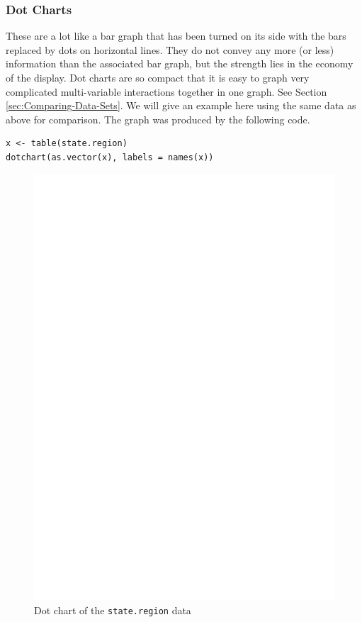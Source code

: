 \documentclass[captions=tableheading]{scrbook}
\begin{document}
\subsubsection{Dot Charts}
\label{sec-2-1-4-4}
\label{par:Dotcharts}


These are a lot like a bar graph that has been turned on its side with the bars replaced by dots on horizontal lines. They do not convey any more (or less) information than the associated bar graph, but the strength lies in the economy of the display. Dot charts are so compact that it is easy to graph very complicated multi-variable interactions together in one graph. See Section \ref{sec:Comparing-Data-Sets}. We will give an example here using the same data as above for comparison. The graph was produced by the following code.

\begin{example}


\begin{verbatim}
x <- table(state.region)
dotchart(as.vector(x), labels = names(x))
\end{verbatim}





\begin{figure}[th]
  \includegraphics[angle=270, totalheight=4in]{ps/dot-charts.ps}
  \caption{Dot chart of the \texttt{state.region} data}
  \label{fig:dot-charts}
\end{figure}



\end{example}
\end{document}
